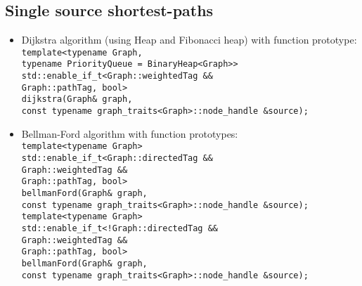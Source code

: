 \documentclass{article}
\begin{document}
\pagebreak

\subsection*{Single source shortest-paths}
\begin{itemize}
	\item Dijkstra algorithm (using Heap and Fibonacci heap) with function prototype:\\
		\texttt{template<typename Graph,\\\hspace*{4.75em}
			typename PriorityQueue = BinaryHeap<Graph>>\\
			std::enable\_if\_t<Graph::weightedTag \&\&\\\hspace*{7.67em}
			Graph::pathTag, bool>\\
			dijkstra(Graph\& graph,\\\hspace*{4.27em}
			const typename graph\_traits<Graph>::node\_handle \&source);}

	\item Bellman-Ford algorithm with function prototypes:\\
		\texttt{template<typename Graph>\\
			std::enable\_if\_t<Graph::directedTag \&\&\\\hspace*{7.67em}
			Graph::weightedTag \&\&\\\hspace*{7.67em}
			Graph::pathTag, bool>\\
			bellmanFord(Graph\& graph,\\\hspace*{5.5em}
			const typename graph\_traits<Graph>::node\_handle \&source);} \\

		\texttt{template<typename Graph>\\
			std::enable\_if\_t<!Graph::directedTag \&\&\\\hspace*{7.67em}
			Graph::weightedTag \&\&\\\hspace*{7.67em}
			Graph::pathTag, bool>\\
			bellmanFord(Graph\& graph,\\\hspace*{5.27em}
			const typename graph\_traits<Graph>::node\_handle \&source);}


\end{itemize}
\end{document}
